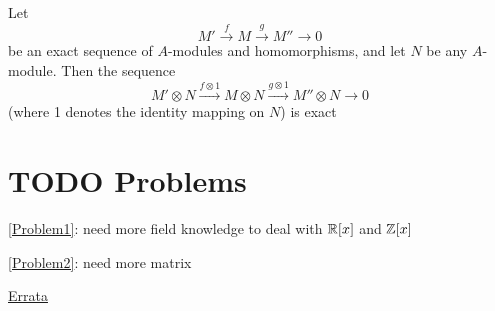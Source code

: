 \documentclass[11pt]{article}
\begin{document}
\begin{proposition}[]
Let
\begin{equation*}
M'\xrightarrow{f}M\xrightarrow{g}M''\to 0
\end{equation*}
be an exact sequence of \(A\)-modules and homomorphisms, and let \(N\) be any \(A\)-module. Then
the sequence
\begin{equation*}
M'\otimes N\xrightarrow{f\otimes 1}M\otimes N\xrightarrow{g\otimes 1}M''\otimes N\to 0
\end{equation*}
(where 1 denotes the identity mapping on \(N\)) is exact
\end{proposition}


\section{{\bfseries\sffamily TODO} Problems}
\label{sec:orgc7721ad}
\ref{Problem1}: need more field knowledge to deal with \(\mathbb{R}[x]\) and \(\mathbb{Z}[x]\)

\ref{Problem2}: need more matrix

\href{https://mathoverflow.net/questions/42241/errata-for-atiyah-macdonald}{Errata}
\end{document}
